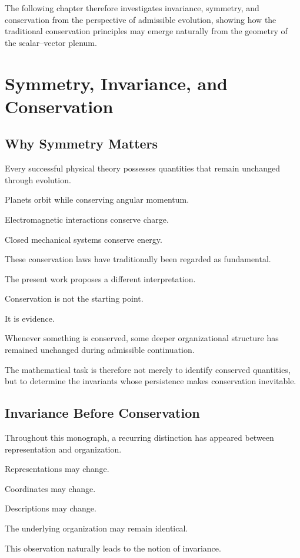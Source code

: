 \documentclass[11pt,oneside]{book}
\numberwithin{equation}{chapter}
\theoremstyle{definition}
\theoremstyle{plain}
\begin{document}
The following chapter therefore investigates invariance, symmetry, and
conservation from the perspective of admissible evolution, showing how the
traditional conservation principles may emerge naturally from the geometry
of the scalar--vector plenum.

\chapter{Symmetry, Invariance, and Conservation}

\section{Why Symmetry Matters}

Every successful physical theory possesses quantities that remain unchanged
through evolution.

Planets orbit while conserving angular momentum.

Electromagnetic interactions conserve charge.

Closed mechanical systems conserve energy.

These conservation laws have traditionally been regarded as fundamental.

The present work proposes a different interpretation.

Conservation is not the starting point.

It is evidence.

Whenever something is conserved, some deeper organizational structure has
remained unchanged during admissible continuation.

The mathematical task is therefore not merely to identify conserved
quantities, but to determine the invariants whose persistence makes
conservation inevitable.

\section{Invariance Before Conservation}

Throughout this monograph, a recurring distinction has appeared between
representation and organization.

Representations may change.

Coordinates may change.

Descriptions may change.

The underlying organization may remain identical.

This observation naturally leads to the notion of invariance.
\end{document}
